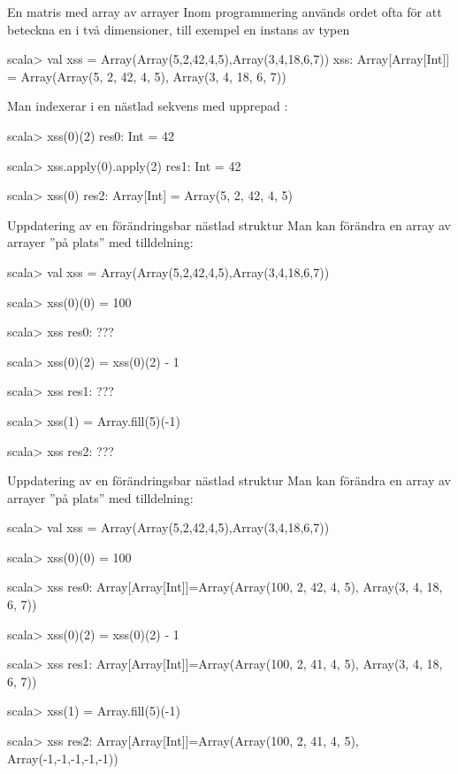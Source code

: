 \begin{Slide}{En matris med array av arrayer}
Inom programmering används ordet  ofta för att beteckna en  i två dimensioner, till exempel en instans av typen 
\begin{REPL}
scala> val xss = Array(Array(5,2,42,4,5),Array(3,4,18,6,7))
xss: Array[Array[Int]] = Array(Array(5, 2, 42, 4, 5), Array(3, 4, 18, 6, 7))
\end{REPL}

Man indexerar i en nästlad sekvens med upprepad :
\begin{REPL}
scala> xss(0)(2)
res0: Int = 42

scala> xss.apply(0).apply(2)
res1: Int = 42

scala> xss(0)
res2: Array[Int] = Array(5, 2, 42, 4, 5)
\end{REPL}
\end{Slide}

\begin{Slide}{Uppdatering av en förändringsbar nästlad struktur}
Man kan förändra en array av arrayer ''på plats'' med tilldelning:
\begin{REPL}
scala> val xss = Array(Array(5,2,42,4,5),Array(3,4,18,6,7))

scala> xss(0)(0) = 100

scala> xss
res0: ???

scala> xss(0)(2) = xss(0)(2) - 1

scala> xss
res1: ???

scala> xss(1) = Array.fill(5)(-1)

scala> xss
res2: ???
\end{REPL}
\end{Slide}

\begin{Slide}{Uppdatering av en förändringsbar nästlad struktur}
Man kan förändra en array av arrayer ''på plats'' med tilldelning:
\begin{REPL}
scala> val xss = Array(Array(5,2,42,4,5),Array(3,4,18,6,7))

scala> xss(0)(0) = 100

scala> xss
res0: Array[Array[Int]]=Array(Array(100, 2, 42, 4, 5), Array(3, 4, 18, 6, 7))

scala> xss(0)(2) = xss(0)(2) - 1

scala> xss
res1: Array[Array[Int]]=Array(Array(100, 2, 41, 4, 5), Array(3, 4, 18, 6, 7))

scala> xss(1) = Array.fill(5)(-1)

scala> xss
res2: Array[Array[Int]]=Array(Array(100, 2, 41, 4, 5), Array(-1,-1,-1,-1,-1))
\end{REPL}
\end{Slide}

